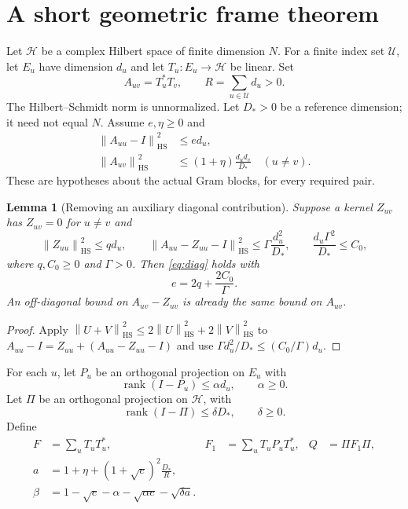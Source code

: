 \documentclass[11pt,letterpaper]{article}
\newtheorem{lemma}[theorem]{Lemma}
\theoremstyle{definition}
\theoremstyle{remark}
\newcommand{\rank}{\operatorname{rank}}
\newcommand{\HS}{\mathrm{HS}}
\newcommand{\norm}[1]{\left\lVert#1\right\rVert}
\numberwithin{equation}{section}
\begin{document}
\section{A short geometric frame theorem}

Let $\mathcal H$ be a complex Hilbert space of finite dimension $N$. For a finite index set $\mathcal U$, let $E_u$ have dimension $d_u$ and let $T_u:E_u\to\mathcal H$ be linear. Set
\[
 A_{uv}=T_u^*T_v,\qquad R=\sum_{u\in\mathcal U}d_u>0.
\]
The Hilbert--Schmidt norm is unnormalized. Let $D_*>0$ be a reference dimension; it need not equal $N$. Assume $e,\eta\ge0$ and
\begin{align}
 \norm{A_{uu}-I}_{\HS}^2&\le e d_u,\label{eq:diag}\\
 \norm{A_{uv}}_{\HS}^2&\le(1+\eta)\frac{d_ud_v}{D_*}\quad(u\ne v).\label{eq:off}
\end{align}
These are hypotheses about the actual Gram blocks, for every required pair.

\begin{lemma}[Removing an auxiliary diagonal contribution]\label{lem:diag}
Suppose a kernel $Z_{uv}$ has $Z_{uv}=0$ for $u\ne v$ and
\[
 \norm{Z_{uu}}_{\HS}^2\le qd_u,\qquad
 \norm{A_{uu}-Z_{uu}-I}_{\HS}^2\le\Gamma\frac{d_u^2}{D_*},
 \qquad \frac{d_u\Gamma^2}{D_*}\le C_0,
\]
where $q,C_0\ge0$ and $\Gamma>0$. Then \eqref{eq:diag} holds with
\[
 e=2q+\frac{2C_0}{\Gamma}.
\]
An off-diagonal bound on $A_{uv}-Z_{uv}$ is already the same bound on $A_{uv}$.
\end{lemma}
\begin{proof}
Apply $\norm{U+V}_{\HS}^2\le2\norm U_{\HS}^2+2\norm V_{\HS}^2$ to $A_{uu}-I=Z_{uu}+(A_{uu}-Z_{uu}-I)$ and use $\Gamma d_u^2/D_*\le(C_0/\Gamma)d_u$.
\end{proof}

For each $u$, let $P_u$ be an orthogonal projection on $E_u$ with
\[
 \rank(I-P_u)\le\alpha d_u,\qquad \alpha\ge0.
\]
Let $\Pi$ be an orthogonal projection on $\mathcal H$, with
\[
 \rank(I-\Pi)\le\delta D_*,\qquad\delta\ge0.
\]
Define
\begin{align}
 F&=\sum_uT_uT_u^*,&F_1&=\sum_uT_uP_uT_u^*,&Q&=\Pi F_1\Pi,\\
 a&=1+\eta+(1+\sqrt e)^2\frac{D_*}{R},\label{eq:a}\\
 \beta&=1-\sqrt e-\alpha-\sqrt{\alpha e}-\sqrt{\delta a}.\label{eq:beta}
\end{align}
\end{document}
